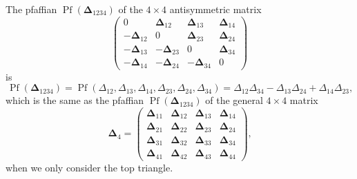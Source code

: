 \documentclass[aps, preprint]{revtex4}
\begin{document}
The pfaffian $\ensuremath{\operatorname*{Pf}} \left (\mathbf{\Delta }_{1 2 3 4}\right )$ of the $4 \times 4$ antisymmetric matrix
\begin{equation}\left (\begin{array}{cccc}0 & \mathbf{\Delta }_{1 2} & \mathbf{\Delta }_{1 3} & \mathbf{\Delta }_{1 4} \\
 -\mathbf{\Delta }_{1 2} & 0 & \mathbf{\Delta }_{2 3} & \mathbf{\Delta }_{2 4} \\
 -\mathbf{\Delta }_{1 3} &  -\mathbf{\Delta }_{2 3} & 0 & \mathbf{\Delta }_{3 4} \\
 -\mathbf{\Delta }_{1 4} &  -\mathbf{\Delta }_{2 4} &  -\mathbf{\Delta }_{3 4} & 0\end{array}\right )
\end{equation}is
\begin{equation}\ensuremath{\operatorname*{Pf}} \left (\mathbf{\Delta }_{1 2 3 4}\right ) =\ensuremath{\operatorname*{Pf}} \left ( \Delta _{1 2} , \Delta _{1 3} , \Delta _{1 4} , \Delta _{2 3} , \Delta _{2 4} , \Delta _{3 4}\right ) = \Delta _{1 2} \Delta _{3 4} -  \Delta _{1 3} \Delta _{2 4} +  \Delta _{1 4} \Delta _{2 3}\text{,}
\end{equation}which is the same as the pfaffian $\ensuremath{\operatorname*{Pf}} \left (\mathbf{\Delta }_{1 2 3 4}\right )$ of the general $4 \times 4$ matrix
\begin{equation}\mathbf{\Delta }_{4} =\left (\begin{array}{cccc}\mathbf{\Delta }_{1 1} & \mathbf{\Delta }_{1 2} & \mathbf{\Delta }_{1 3} & \mathbf{\Delta }_{1 4} \\
\mathbf{\Delta }_{2 1} & \mathbf{\Delta }_{2 2} & \mathbf{\Delta }_{2 3} & \mathbf{\Delta }_{2 4} \\
\mathbf{\Delta }_{3 1} & \mathbf{\Delta }_{3 2} & \mathbf{\Delta }_{3 3} & \mathbf{\Delta }_{3 4} \\
\mathbf{\Delta }_{4 1} & \mathbf{\Delta }_{4 2} & \mathbf{\Delta }_{4 3} & \mathbf{\Delta }_{4 4}\end{array}\right )\text{,}
\end{equation}when we only consider the top triangle. 
\end{document}
